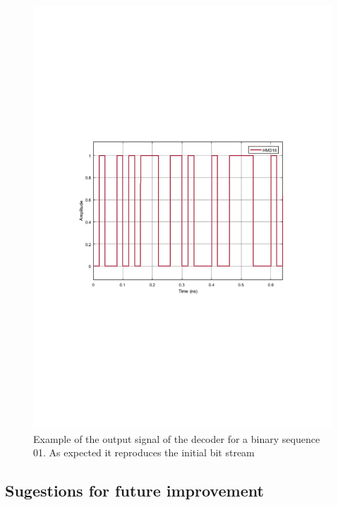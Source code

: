 \begin{figure}[h]
	\centering
	\includegraphics[width=\textwidth]{./lib/decoder/figures/MQAM_decoder_output.pdf}
	\caption{Example of the output signal of the decoder for a binary sequence 01. As expected it reproduces the initial bit stream}\label{Decoder_output}
\end{figure}

\subsection*{Sugestions for future improvement}
